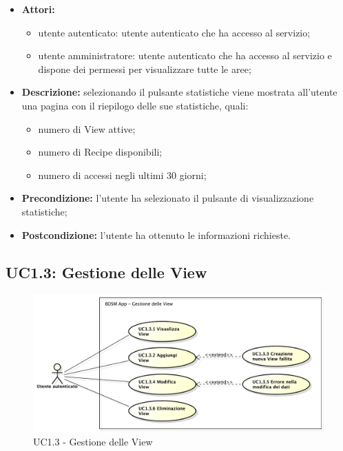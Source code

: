 \begin{itemize}
    \item \textbf{Attori:}
    \begin{itemize}
        \item utente autenticato: utente autenticato che ha accesso al servizio;
        \item utente amministratore: utente autenticato che ha accesso al servizio e dispone dei permessi per visualizzare tutte le aree;
    \end{itemize}
    \item \textbf{Descrizione:} selezionando il pulsante statistiche viene mostrata all'utente una pagina con il riepilogo delle sue statistiche, quali:
    \begin{itemize}
        \item numero di View attive;
        \item numero di Recipe disponibili;
        \item numero di accessi negli ultimi 30 giorni;
    \end{itemize}
    \item \textbf{Precondizione:} l'utente ha selezionato il pulsante di visualizzazione statistiche;
    \item \textbf{Postcondizione:} l'utente ha ottenuto le informazioni richieste.
\end{itemize}

\pagebreak
\subsection{UC1.3: Gestione delle View}

\begin{figure}[!htbp]
    \centering
    \centerline{\includegraphics[scale=0.45]{./images/UC1_3.pdf}}
    \caption{UC1.3 - Gestione delle View}
\end{figure}

